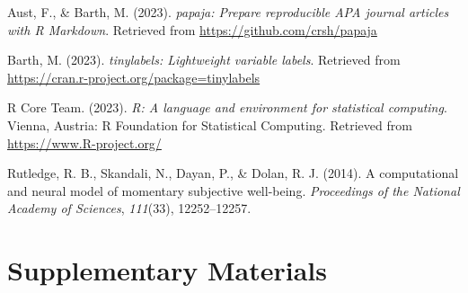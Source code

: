 \documentclass[
  man]{apa6}
\newlength{\cslhangindent}
\newlength{\cslentryspacingunit} %
\newenvironment{CSLReferences}[2] %
 {%
  \setlength{\parindent}{0pt}
  \ifodd #1
  \let\oldpar\par
  \def\par{\hangindent=\cslhangindent\oldpar}
  \fi
  \setlength{\parskip}{#2\cslentryspacingunit}
 }%
 {}
\begin{document}
\hypertarget{refs}{}
\begin{CSLReferences}{1}{0}
\leavevmode{}%
Aust, F., \& Barth, M. (2023). \emph{{papaja}: {Prepare} reproducible {APA} journal articles with {R Markdown}}. Retrieved from \url{https://github.com/crsh/papaja}

\leavevmode{}%
Barth, M. (2023). \emph{{tinylabels}: Lightweight variable labels}. Retrieved from \url{https://cran.r-project.org/package=tinylabels}

\leavevmode{}%
R Core Team. (2023). \emph{R: A language and environment for statistical computing}. Vienna, Austria: R Foundation for Statistical Computing. Retrieved from \url{https://www.R-project.org/}

\leavevmode{}%
Rutledge, R. B., Skandali, N., Dayan, P., \& Dolan, R. J. (2014). A computational and neural model of momentary subjective well-being. \emph{Proceedings of the National Academy of Sciences}, \emph{111}(33), 12252--12257.

\end{CSLReferences}

\newpage

\hypertarget{supplementary-materials}{%
\section{Supplementary Materials}\label{supplementary-materials}}
\end{document}

